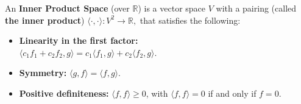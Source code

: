 \newpage

\begin{defn}
	An \textbf{Inner Product Space} (over $\mathbb{R}$) is a vector space $V$ with a pairing (called \textbf{the inner product}) $\langle\cdot,\cdot\rangle:V^2 \rightarrow \mathbb{R},$ that satisfies the following: 
	
	\begin{itemize}
		\item \textbf{Linearity in the first factor:}\\ $\langle  c_1 f_1 + c_2 f_2, g\rangle = c_1 \langle f_1, g\rangle + c_2 \langle f_2, g\rangle$.		
		\item \textbf{Symmetry:} $\langle g, f\rangle = \langle f, g\rangle$.
		
		\item \textbf{Positive definiteness:} $\langle f, f\rangle \geq 0$, 
		with $\langle f, f\rangle = 0$ if and only if $f = 0.$
		
		
	\end{itemize}
\end{defn}


